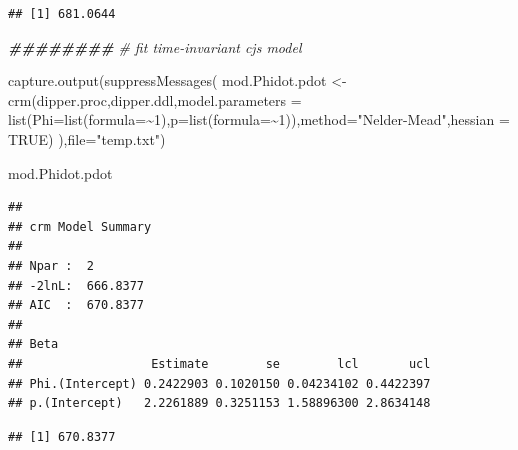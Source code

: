 \documentclass[
]{article}
\newenvironment{Shaded}{\begin{snugshade}}{\end{snugshade}}
\newcommand{\AttributeTok}[1]{\textcolor[rgb]{0.77,0.63,0.00}{#1}}
\newcommand{\CommentTok}[1]{\textcolor[rgb]{0.56,0.35,0.01}{\textit{#1}}}
\newcommand{\ConstantTok}[1]{\textcolor[rgb]{0.00,0.00,0.00}{#1}}
\newcommand{\DecValTok}[1]{\textcolor[rgb]{0.00,0.00,0.81}{#1}}
\newcommand{\DocumentationTok}[1]{\textcolor[rgb]{0.56,0.35,0.01}{\textbf{\textit{#1}}}}
\newcommand{\FunctionTok}[1]{\textcolor[rgb]{0.00,0.00,0.00}{#1}}
\newcommand{\NormalTok}[1]{#1}
\newcommand{\OtherTok}[1]{\textcolor[rgb]{0.56,0.35,0.01}{#1}}
\newcommand{\SpecialCharTok}[1]{\textcolor[rgb]{0.00,0.00,0.00}{#1}}
\newcommand{\StringTok}[1]{\textcolor[rgb]{0.31,0.60,0.02}{#1}}
\begin{document}
\begin{Shaded}
\end{Shaded}

\begin{verbatim}
## [1] 681.0644
\end{verbatim}

\begin{Shaded}
\begin{Highlighting}[]
\DocumentationTok{\#\#\#\#\#\#\#\#}
\CommentTok{\# fit time{-}invariant cjs model}

\FunctionTok{capture.output}\NormalTok{(}\FunctionTok{suppressMessages}\NormalTok{(}
\NormalTok{  mod.Phidot.pdot }\OtherTok{\textless{}{-}} \FunctionTok{crm}\NormalTok{(dipper.proc,dipper.ddl,}\AttributeTok{model.parameters =} \FunctionTok{list}\NormalTok{(}\AttributeTok{Phi=}\FunctionTok{list}\NormalTok{(}\AttributeTok{formula=}\SpecialCharTok{\textasciitilde{}}\DecValTok{1}\NormalTok{),}\AttributeTok{p=}\FunctionTok{list}\NormalTok{(}\AttributeTok{formula=}\SpecialCharTok{\textasciitilde{}}\DecValTok{1}\NormalTok{)),}\AttributeTok{method=}\StringTok{"Nelder{-}Mead"}\NormalTok{,}\AttributeTok{hessian =} \ConstantTok{TRUE}\NormalTok{)}
\NormalTok{),}\AttributeTok{file=}\StringTok{"temp.txt"}\NormalTok{)}

\NormalTok{mod.Phidot.pdot}
\end{Highlighting}
\end{Shaded}

\begin{verbatim}
## 
## crm Model Summary
## 
## Npar :  2
## -2lnL:  666.8377
## AIC  :  670.8377
## 
## Beta
##                  Estimate        se        lcl       ucl
## Phi.(Intercept) 0.2422903 0.1020150 0.04234102 0.4422397
## p.(Intercept)   2.2261889 0.3251153 1.58896300 2.8634148
\end{verbatim}

\begin{Shaded}
\end{Shaded}

\begin{verbatim}
## [1] 670.8377
\end{verbatim}
\end{document}

